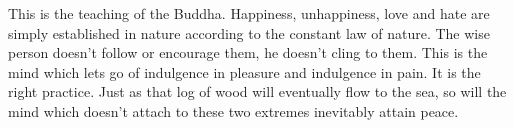 This is the teaching of the Buddha. Happiness, unhappiness, love and hate are simply established in nature according to the constant law of nature. The wise person doesn't follow or encourage them, he doesn't cling to them. This is the mind which lets go of indulgence in pleasure and indulgence in pain. It is the right practice. Just as that log of wood will eventually flow to the sea, so will the mind which doesn't attach to these two extremes inevitably attain peace.

